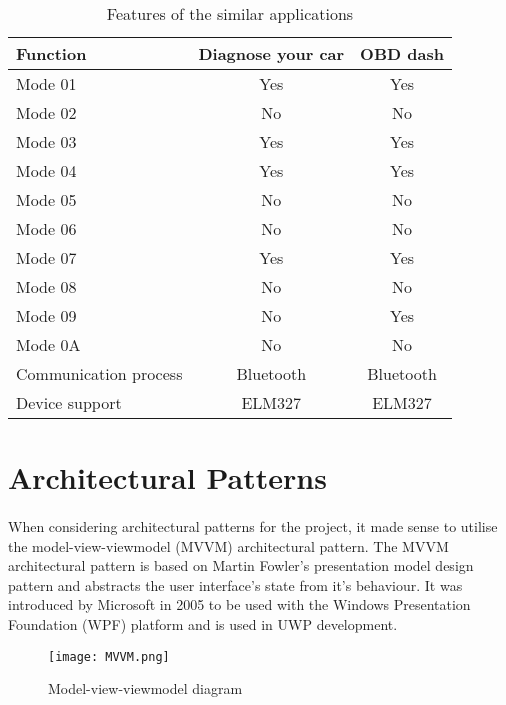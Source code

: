 		\begin{table}[h]
		\begin{center}				
			\begin{tabular}{| l | c | c |}
			\hline
			\textbf{Function} & \textbf{Diagnose your car}  &\textbf{OBD dash}\\
			\hline
			Mode 01 & Yes & Yes\\
			\hline
			Mode 02 & No & No\\
			\hline
			Mode 03 & Yes & Yes\\
			\hline
			Mode 04 & Yes & Yes\\
			\hline
			Mode 05 & No & No\\
			\hline
			Mode 06 & No & No\\
			\hline
			Mode 07 & Yes & Yes\\
			\hline
			Mode 08 & No & No\\
			\hline
			Mode 09 & No & Yes\\
			\hline
			Mode 0A & No & No\\
			\hline
			Communication process & Bluetooth & Bluetooth\\
			\hline
			Device support & ELM327 & ELM327\\
			\hline			
			\end{tabular}
			\caption{Features of the similar applications}
			\label{tab:Features}
		\end{center}
	\end{table}
\newpage
\section{Architectural Patterns}
	\paragraph{}{
	When considering architectural patterns for the project, it made sense to utilise the model-view-viewmodel (MVVM) architectural pattern. The MVVM architectural pattern is based on Martin Fowler's presentation model design pattern and abstracts the user interface's state from it's behaviour. It was introduced by Microsoft in 2005 to be used with the Windows Presentation Foundation (WPF) platform and is used in UWP development.
			\begin{figure}[h]
				\begin{center}											
					\texttt{[image: MVVM.png]}
					\caption{Model-view-viewmodel diagram}											\label{fig:MVVM}
				\end{center}
			\end{figure}
	}
